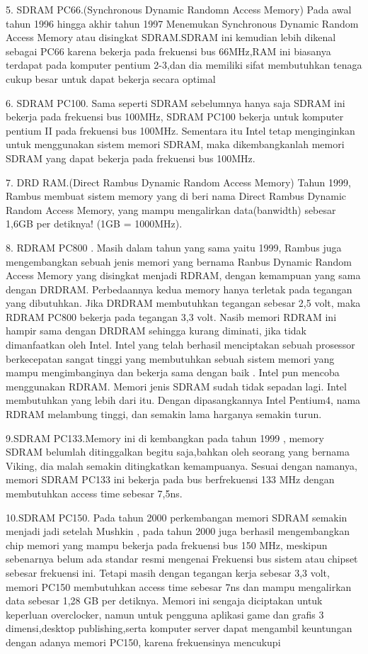 5.	SDRAM PC66.(Synchronous Dynamic Randomn Access Memory) Pada awal tahun 1996 hingga akhir tahun 1997 Menemukan Synchronous Dynamic Random Access Memory atau disingkat SDRAM.SDRAM ini kemudian lebih dikenal sebagai PC66 karena bekerja pada frekuensi bus 66MHz,RAM ini biasanya terdapat pada komputer pentium 2-3,dan dia memiliki sifat membutuhkan tenaga cukup besar untuk dapat bekerja secara optimal

6. SDRAM PC100. Sama seperti SDRAM sebelumnya hanya saja SDRAM ini bekerja pada frekuensi bus 100MHz, SDRAM PC100 bekerja untuk komputer pentium II pada frekuensi bus 100MHz. Sementara itu Intel tetap menginginkan untuk menggunakan sistem memori SDRAM, maka dikembangkanlah memori SDRAM yang dapat bekerja pada frekuensi bus 100MHz.

7. DRD RAM.(Direct Rambus Dynamic Random Access Memory) Tahun 1999, Rambus membuat sistem memory yang di beri nama Direct Rambus Dynamic Random Access Memory, yang mampu mengalirkan data(banwidth) sebesar 1,6GB per detiknya! (1GB = 1000MHz).

8. RDRAM PC800 . Masih dalam tahun yang sama yaitu 1999, Rambus juga mengembangkan sebuah jenis memori yang bernama Ranbus Dynamic Random Access Memory yang disingkat menjadi RDRAM, dengan kemampuan yang sama dengan DRDRAM. Perbedaannya kedua memory hanya terletak pada tegangan yang dibutuhkan. Jika DRDRAM membutuhkan tegangan sebesar 2,5 volt, maka RDRAM PC800 bekerja pada tegangan 3,3 volt. Nasib memori RDRAM ini hampir sama dengan DRDRAM sehingga kurang diminati, jika tidak dimanfaatkan oleh Intel. Intel yang telah berhasil menciptakan sebuah prosessor berkecepatan sangat tinggi yang membutuhkan sebuah sistem memori yang mampu mengimbanginya dan bekerja sama dengan baik . Intel pun mencoba menggunakan RDRAM. Memori jenis SDRAM sudah tidak sepadan lagi. Intel membutuhkan yang lebih dari itu. Dengan dipasangkannya Intel Pentium4, nama RDRAM melambung tinggi, dan semakin lama harganya semakin turun.

9.SDRAM PC133.Memory ini di kembangkan pada tahun 1999 , memory SDRAM belumlah ditinggalkan begitu saja,bahkan oleh seorang yang bernama Viking, dia malah semakin ditingkatkan kemampuanya. Sesuai dengan namanya, memori SDRAM PC133 ini bekerja pada bus berfrekuensi 133 MHz dengan membutuhkan access time sebesar 7,5ns.

10.SDRAM PC150. Pada tahun 2000 perkembangan memori SDRAM semakin menjadi jadi setelah Mushkin , pada tahun 2000 juga berhasil mengembangkan chip memori yang mampu bekerja pada frekuensi bus 150 MHz, meskipun sebenarnya belum ada standar resmi mengenai Frekuensi bus sistem atau chipset sebesar frekuensi ini. Tetapi masih dengan tegangan kerja sebesar 3,3 volt, memori PC150 membutuhkan access time sebesar 7ns dan mampu mengalirkan data sebesar 1,28 GB per detiknya. Memori ini sengaja diciptakan untuk keperluan overclocker, namun untuk pengguna aplikasi game dan grafis 3 dimensi,desktop publishing,serta komputer server dapat mengambil keuntungan dengan adanya memori PC150, karena frekuensinya mencukupi
